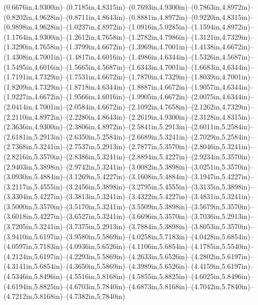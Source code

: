 (0.6676in,4.9300in)--(0.7185in,4.8315in)--(0.7693in,4.9300in)--(0.7863in,4.8972in)--(0.8202in,4.9628in)--(0.8711in,4.8643in)--(0.8881in,4.8972in)--(0.9220in,4.8315in)--(0.9898in,4.9628in)--(1.0237in,4.8972in)--(1.0916in,5.0285in)--(1.1594in,4.8972in)--(1.1764in,4.9300in)--(1.2612in,4.7658in)--(1.2782in,4.7986in)--(1.3121in,4.7329in)--(1.3290in,4.7658in)--(1.3799in,4.6672in)--(1.3969in,4.7001in)--(1.4138in,4.6672in)--(1.4308in,4.7001in)--(1.4817in,4.6016in)--(1.4986in,4.6344in)--(1.5326in,4.5687in)--(1.5495in,4.6016in)--(1.5665in,4.5687in)--(1.6343in,4.7001in)--(1.6683in,4.6344in)--(1.7191in,4.7329in)--(1.7531in,4.6672in)--(1.7870in,4.7329in)--(1.8039in,4.7001in)--(1.8209in,4.7329in)--(1.8718in,4.6344in)--(1.8887in,4.6672in)--(1.9057in,4.6344in)--(1.9227in,4.6672in)--(1.9566in,4.6016in)--(1.9905in,4.6672in)--(2.0075in,4.6344in)--(2.0414in,4.7001in)--(2.0584in,4.6672in)--(2.1092in,4.7658in)--(2.1262in,4.7329in)--(2.2110in,4.8972in)--(2.2280in,4.8643in)--(2.2619in,4.9300in)--(2.3128in,4.8315in)--(2.3636in,4.9300in)--(2.3806in,4.8972in)--(2.5841in,5.2913in)--(2.6011in,5.2584in)--(2.6181in,5.2913in)--(2.6350in,5.2584in)--(2.6689in,5.3241in)--(2.7029in,5.2584in)--(2.7368in,5.3241in)--(2.7537in,5.2913in)--(2.7877in,5.3570in)--(2.8046in,5.3241in)--(2.8216in,5.3570in)--(2.8386in,5.3241in)--(2.8894in,5.4227in)--(2.9234in,5.3570in)--(2.9403in,5.3898in)--(2.9742in,5.3241in)--(3.0082in,5.3898in)--(3.0251in,5.3570in)--(3.0930in,5.4884in)--(3.1269in,5.4227in)--(3.1608in,5.4884in)--(3.1947in,5.4227in)--(3.2117in,5.4555in)--(3.2456in,5.3898in)--(3.2795in,5.4555in)--(3.3135in,5.3898in)--(3.3304in,5.4227in)--(3.3813in,5.3241in)--(3.4322in,5.4227in)--(3.4831in,5.3241in)--(3.5000in,5.3570in)--(3.5170in,5.3241in)--(3.5509in,5.3898in)--(3.5679in,5.3570in)--(3.6018in,5.4227in)--(3.6527in,5.3241in)--(3.6696in,5.3570in)--(3.7036in,5.2913in)--(3.7205in,5.3241in)--(3.7375in,5.2913in)--(3.7884in,5.3898in)--(3.8053in,5.3570in)--(3.9410in,5.6197in)--(3.9580in,5.5869in)--(4.0258in,5.7183in)--(4.0428in,5.6854in)--(4.0597in,5.7183in)--(4.0936in,5.6526in)--(4.1106in,5.6854in)--(4.1785in,5.5540in)--(4.2124in,5.6197in)--(4.2293in,5.5869in)--(4.2633in,5.6526in)--(4.2802in,5.6197in)--(4.3141in,5.6854in)--(4.3650in,5.5869in)--(4.3989in,5.6526in)--(4.4159in,5.6197in)--(4.5346in,5.8496in)--(4.5516in,5.8168in)--(4.5855in,5.8825in)--(4.6025in,5.8496in)--(4.6194in,5.8825in)--(4.6703in,5.7840in)--(4.6873in,5.8168in)--(4.7042in,5.7840in)--(4.7212in,5.8168in)--(4.7382in,5.7840in)
